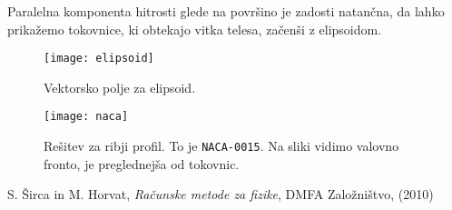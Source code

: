 \documentclass[a4 paper, 12pt]{article}
\begin{document}
Paralelna komponenta hitrosti glede na povr\v sino je zadosti natan\v cna, da lahko prika\v zemo tokovnice, ki obtekajo
vitka telesa, za\v cen\v si z elipsoidom. 

\begin{figure}[H]\centering
	\texttt{[image: elipsoid]}
	\caption{Vektorsko polje za elipsoid.}
	\label{gr3}
\end{figure}

\begin{figure}[H]\centering
	\texttt{[image: naca]}
	\caption{Re\v sitev za ribji profil. To je {\tt NACA-0015}. Na sliki vidimo valovno fronto,
		je preglednej\v sa od tokovnic.}
	\label{gr4}
\end{figure}

\begin{thebibliography}{9}
		S. \v Sirca in M. Horvat,
		{\em Ra\v cunske metode za fizike},
		DMFA Zalo\v zni\v stvo,
		(2010)
\end{thebibliography}
\end{document}
